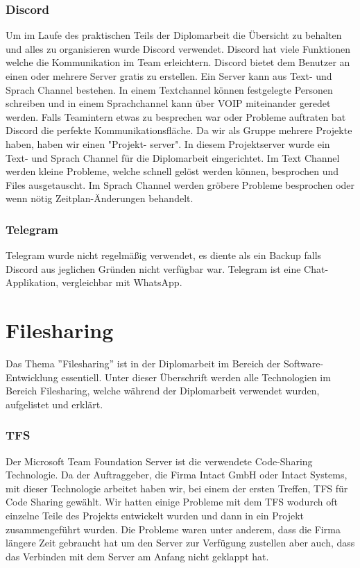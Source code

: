 \subsubsection {Discord}
\label{sec:Discord}
Um im Laufe des praktischen Teils der Diplomarbeit die Übersicht zu behalten und alles zu organisieren wurde Discord verwendet. Discord hat viele Funktionen welche die Kommunikation im Team erleichtern. Discord bietet dem Benutzer an einen oder mehrere Server gratis zu erstellen. Ein Server kann aus Text- und Sprach Channel bestehen. In einem Textchannel können festgelegte Personen schreiben und in einem Sprachchannel kann über VOIP miteinander geredet werden. Falls Teamintern etwas zu besprechen war oder Probleme auftraten bat Discord die perfekte Kommunikationsfläche. Da wir als Gruppe mehrere Projekte haben, haben wir einen "Projekt- server". In diesem Projektserver wurde ein Text- und Sprach Channel für die Diplomarbeit eingerichtet. Im Text Channel werden kleine Probleme, welche schnell gelöst werden können, besprochen und Files ausgetauscht. Im Sprach Channel werden gröbere Probleme besprochen oder wenn nötig Zeitplan-Änderungen behandelt. 
\subsubsection {Telegram}
\label{sec:Telegram}
Telegram wurde nicht regelmäßig verwendet, es diente als ein Backup falls Discord aus jeglichen Gründen nicht verfügbar war. Telegram ist eine Chat-Applikation, vergleichbar mit WhatsApp. 
\section{Filesharing}
\label{sec:Filesharing}
Das Thema ''Filesharing'' ist in der Diplomarbeit im Bereich der Software-Entwicklung essentiell. Unter dieser Überschrift werden alle Technologien im Bereich Filesharing, welche während der Diplomarbeit verwendet wurden, aufgelistet und erklärt. 
\subsubsection {TFS}
\label{sec:TFS}
Der Microsoft Team Foundation Server ist die verwendete Code-Sharing Technologie. Da der Auftraggeber, die Firma Intact GmbH oder Intact Systems, mit dieser Technologie arbeitet haben wir, bei einem der ersten Treffen, TFS für Code Sharing gewählt. Wir hatten einige Probleme mit dem TFS wodurch oft einzelne Teile des Projekts entwickelt wurden und dann in ein Projekt zusammengeführt wurden. Die Probleme waren unter anderem, dass die Firma längere Zeit gebraucht hat um den Server zur Verfügung zustellen aber auch, dass das Verbinden mit dem Server am Anfang nicht geklappt hat. 
%
